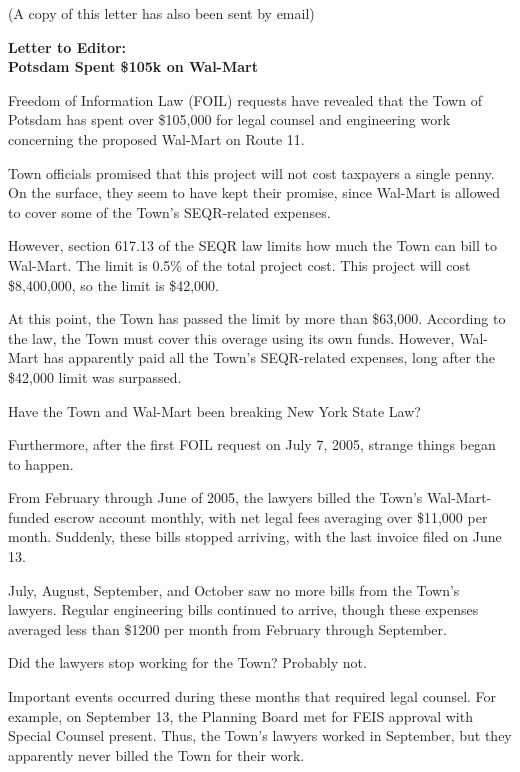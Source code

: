 \documentclass[12pt]{article}
\begin{document}
\noindent (A copy of this letter has also been sent by email)

\vspace{0.1in}

{\bf 
\noindent Letter to Editor:\\
Potsdam Spent \$105k on Wal-Mart}

\vspace{0.1in}


Freedom of Information Law (FOIL) requests have revealed that the Town of Potsdam has spent over \$105,000 for legal counsel and engineering work concerning the proposed Wal-Mart on Route 11.

Town officials promised that this project will not cost taxpayers a single penny.  On the surface, they seem to have kept their promise, since Wal-Mart is allowed to cover some of the Town's SEQR-related expenses.

However, section 617.13 of the SEQR law limits how much the Town can bill to Wal-Mart.  The limit is 0.5\% of the total project cost.  This project will cost \$8,400,000, so the limit is \$42,000.

At this point, the Town has passed the limit by more than \$63,000.  According to the law, the Town must cover this overage using its own funds.  However, Wal-Mart has apparently paid all the Town's SEQR-related expenses, long after the \$42,000 limit was surpassed.  

Have the Town and Wal-Mart been breaking New York State Law?

Furthermore, after the first FOIL request on July 7, 2005, strange things began to happen.

From February through June of 2005, the lawyers billed the Town's Wal-Mart-funded escrow account monthly, with net legal fees averaging over \$11,000 per month.  Suddenly, these bills stopped arriving, with the last invoice filed on June 13.

July, August, September, and October saw no more bills from the Town's lawyers.  Regular engineering bills continued to arrive, though these expenses averaged less than \$1200 per month from February through September.

Did the lawyers stop working for the Town?  Probably not.

Important events occurred during these months that required legal counsel.  For example, on September 13, the Planning Board met for FEIS approval with Special Counsel present.  Thus, the Town's lawyers worked in September, but they apparently never billed the Town for their work.
\end{document}
